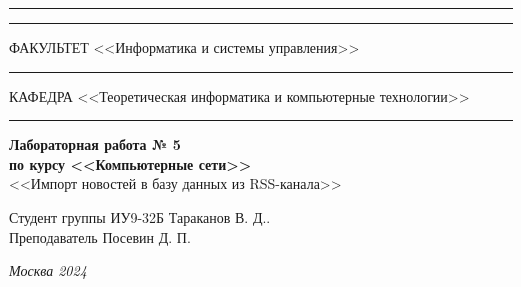 \documentclass[a4paper, 14pt]{extarticle}
\begin{document}
\begin{titlepage}
		\vspace{-25pt}
		\hspace{-35pt}\rule{\textwidth}{2.3pt}
		
		\vspace*{-20.3pt}
		\hspace{-35pt}\rule{\textwidth}{0.4pt}
		
		\vspace{1.5ex}
		\hspace{-35pt} \noindent \small ФАКУЛЬТЕТ\hspace{80pt} <<Информатика и системы управления>>
		
		\vspace*{-16pt}
		\hspace{47pt}\rule{0.83\textwidth}{0.4pt}
		
		\vspace{0.5ex}
		\hspace{-35pt} \noindent \small КАФЕДРА\hspace{50pt} <<Теоретическая информатика и компьютерные технологии>>
		
		\vspace*{-16pt}
		\hspace{30pt}\rule{0.866\textwidth}{0.4pt}
		
		\vspace{11em}
		
		\begin{center}
			\Large {\bf Лабораторная работа № 5} \\
			\large {\bf по курсу <<Компьютерные сети>>} \\
			\large <<Импорт новостей в базу данных из RSS-канала>>
		\end{center}\normalsize
		
		\vspace{8em}
		
		
		\begin{flushright}
			{Студент группы ИУ9-32Б  Тараканов В. Д.. \hspace*{15pt}\\
				\vspace{2ex}
				Преподаватель Посевин Д. П.\hspace*{15pt}}
		\end{flushright}
		
		\bigskip
		
		\vfill
		
		
		\begin{center}
			\textsl{Москва 2024}
		\end{center}
	\end{titlepage}
	
\end{document}
